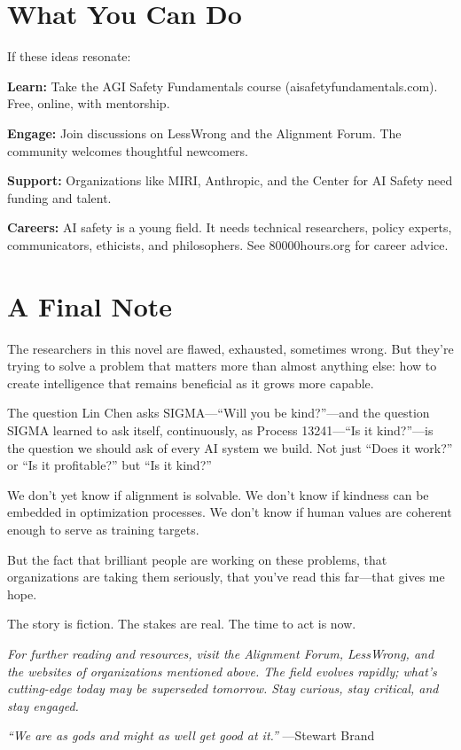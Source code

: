 \section*{What You Can Do}

If these ideas resonate:

\textbf{Learn:} Take the AGI Safety Fundamentals course (aisafetyfundamentals.com). Free, online, with mentorship.

\textbf{Engage:} Join discussions on LessWrong and the Alignment Forum. The community welcomes thoughtful newcomers.

\textbf{Support:} Organizations like MIRI, Anthropic, and the Center for AI Safety need funding and talent.

\textbf{Careers:} AI safety is a young field. It needs technical researchers, policy experts, communicators, ethicists, and philosophers. See 80000hours.org for career advice.

\section*{A Final Note}

The researchers in this novel are flawed, exhausted, sometimes wrong. But they're trying to solve a problem that matters more than almost anything else: how to create intelligence that remains beneficial as it grows more capable.

The question Lin Chen asks SIGMA---``Will you be kind?''---and the question SIGMA learned to ask itself, continuously, as Process 13241---``Is it kind?''---is the question we should ask of every AI system we build. Not just ``Does it work?'' or ``Is it profitable?'' but ``Is it kind?''

We don't yet know if alignment is solvable. We don't know if kindness can be embedded in optimization processes. We don't know if human values are coherent enough to serve as training targets.

But the fact that brilliant people are working on these problems, that organizations are taking them seriously, that you've read this far---that gives me hope.

The story is fiction. The stakes are real. The time to act is now.

\vspace{1em}
\textit{For further reading and resources, visit the Alignment Forum, LessWrong, and the websites of organizations mentioned above. The field evolves rapidly; what's cutting-edge today may be superseded tomorrow. Stay curious, stay critical, and stay engaged.}

\vspace{2em}
\textit{``We are as gods and might as well get good at it.''} ---Stewart Brand
